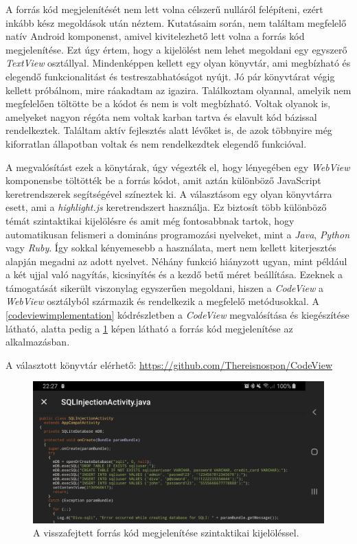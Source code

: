 \documentclass{thesis-ekf}
\theoremstyle{definition}
\theoremstyle{remark}
\begin{document}
A forrás kód megjelenítését nem lett volna célszerű nulláról felépíteni, ezért inkább kész megoldások után néztem.
Kutatásaim során, nem találtam megfelelő natív Android komponenst, amivel kivitelezhető lett volna a forrás kód megjelenítése.
Ezt úgy értem, hogy a kijelölést nem lehet megoldani egy egyszerő \emph{TextView} osztállyal.
Mindenképpen kellett egy olyan könyvtár, ami megbízható és elegendő funkcionalitást és testreszabhatóságot nyújt.
Jó pár könyvtárat végig kellett próbálnom, mire ráakadtam az igazira.
Találkoztam olyannal, amelyik nem megfelelően töltötte be a kódot és nem is volt megbízható.
Voltak olyanok is, amelyeket nagyon régóta nem voltak karban tartva és elavult kód bázissal rendelkeztek.
Találtam aktív fejlesztés alatt lévőket is, de azok többnyire még kiforratlan állapotban voltak és nem rendelkezdtek elegendő funkcióval.

A megvalósítást ezek a könytárak, úgy végezték el, hogy lényegében egy \emph{WebView} komponensbe töltötték be a forrás kódot, amit aztán különböző JavaScript keretrendszerek segítségével színeztek ki.
A választásom egy olyan könyvtárra esett, ami a \emph{highlight.js} keretrendszert használja.
Ez biztosít több különböző témát szintaktikai kijelölésre és amit még fontosabbnak tartok, hogy automatikusan felismeri a domináns programozási nyelveket, mint a \emph{Java}, \emph{Python} vagy \emph{Ruby}.
Így sokkal kényemesebb a használata, mert nem kellett kiterjesztés alapján megadni az adott nyelvet.
Néhány funkció hiányzott ugyan, mint például a két ujjal való nagyítás, kicsinyítés és a kezdő betű méret beállítása.
Ezeknek a támogatását sikerült viszonylag egyszerűen megoldani, hiszen a \emph{CodeView} a \emph{WebView} osztályból származik és rendelkezik a megfelelő metódusokkal.
A \ref{codeviewimplementation} kódrészletben a \emph{CodeView} megvalósítása és kiegészítése látható, alatta pedig a \ref{codeview} képen látható a forrás kód megjelenítése az alkalmazásban.

A választott könyvtár elérhető: \url{https://github.com/Thereisnospon/CodeView}



\begin{figure}[!h]
	\centering
	\includegraphics[width=15cm]{pictures/codeview}
	\caption{A visszafejtett forrás kód megjelenítése szintaktikai kijelöléssel.}
	\label{codeview}
\end{figure}
\end{document}

